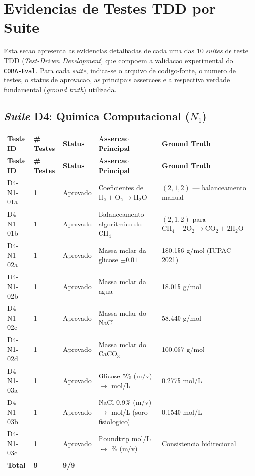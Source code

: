 \newpage

\section{Evidencias de Testes TDD por Suite}

Esta secao apresenta as evidencias detalhadas de cada uma das 10 \textit{suites} de teste TDD (\textit{Test-Driven Development}) que compoem a validacao experimental do \texttt{CORA-Eval}. Para cada \textit{suite}, indica-se o arquivo de codigo-fonte, o numero de testes, o status de aprovacao, as principais assercoes e a respectiva verdade fundamental (\textit{ground truth}) utilizada.

\subsection{\textit{Suite} D4: Quimica Computacional ($N_1$)}

\begin{longtable}{|p{2.5cm}|p{2.0cm}|p{2.0cm}|p{3.5cm}|p{3.5cm}|}
\hline
\textbf{Teste ID} & \textbf{\# Testes} & \textbf{Status} & \textbf{Assercao Principal} & \textbf{Ground Truth} \\
\hline
\endfirsthead
\hline
\textbf{Teste ID} & \textbf{\# Testes} & \textbf{Status} & \textbf{Assercao Principal} & \textbf{Ground Truth} \\
\hline
\endhead
\hline
\endfoot
D4-N1-01a & 1 & Aprovado & Coeficientes de $\text{H}_{2}+\text{O}_{2}\rightarrow\text{H}_{2}\text{O}$ & $(2,1,2)$ --- balanceamento manual \\
\hline
D4-N1-01b & 1 & Aprovado & Balanceamento algoritmico do $\text{CH}_{4}$ & $(2,1,2)$ para $\text{CH}_{4}+2\text{O}_{2}\rightarrow\text{CO}_{2}+2\text{H}_{2}\text{O}$ \\
\hline
D4-N1-02a & 1 & Aprovado & Massa molar da glicose $\pm 0.01$ & 180.156 g/mol (IUPAC 2021) \\
\hline
D4-N1-02b & 1 & Aprovado & Massa molar da agua & 18.015 g/mol \\
\hline
D4-N1-02c & 1 & Aprovado & Massa molar do NaCl & 58.440 g/mol \\
\hline
D4-N1-02d & 1 & Aprovado & Massa molar do $\text{CaCO}_{3}$ & 100.087 g/mol \\
\hline
D4-N1-03a & 1 & Aprovado & Glicose 5\% (m/v) $\rightarrow$ mol/L & 0.2775 mol/L \\
\hline
D4-N1-03b & 1 & Aprovado & NaCl 0.9\% (m/v) $\rightarrow$ mol/L (soro fisiologico) & 0.1540 mol/L \\
\hline
D4-N1-03c & 1 & Aprovado & Roundtrip mol/L $\leftrightarrow$ \% (m/v) & Consistencia bidirecional \\
\hline
\textbf{Total} & \textbf{9} & \textbf{9/9} & --- & --- \\
\hline
\end{longtable}

